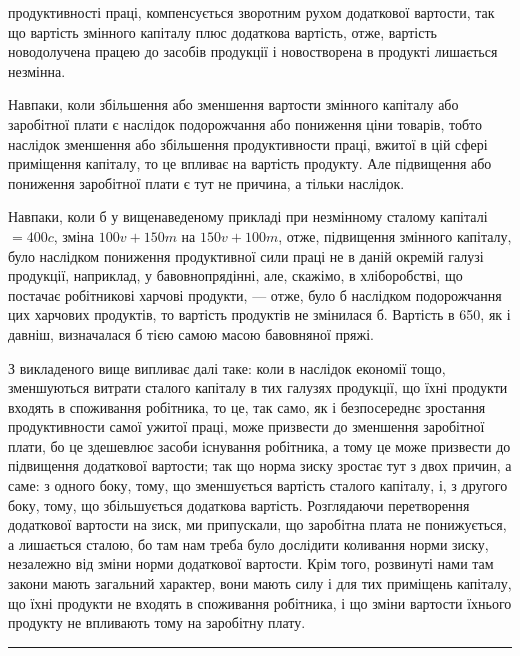 \parcont{}  %
продуктивності праці, компенсується зворотним рухом додаткової вартости, так що
вартість змінного капіталу плюс додаткова вартість, отже, вартість новодолучена
працею до засобів продукції і новостворена в продукті лишається незмінна.

Навпаки, коли збільшення або зменшення вартости змінного капіталу або
заробітної плати є наслідок подорожчання або пониження ціни товарів, тобто
наслідок зменшення або збільшення продуктивности праці, вжитої в цій сфері
приміщення капіталу, то це впливає на вартість продукту. Але підвищення
або пониження заробітної плати є тут не причина, а тільки наслідок.

Навпаки, коли б у вищенаведеному прикладі при незмінному сталому
капіталі $= 400 c$, зміна $100 v + 150 m$ на $150 v + 100 m$, отже, підвищення
змінного капіталу, було наслідком пониження продуктивної сили праці не в даній
окремій галузі продукції, наприклад, у бавовнопрядінні, але, скажімо, в хліборобстві,
що постачає робітникові харчові продукти, — отже, було б наслідком
подорожчання цих харчових продуктів, то вартість продуктів не змінилася б.
Вартість в 650, як і давніш, визначалася б тією самою масою бавовняної пряжі.

З викладеного вище випливає далі таке: коли в наслідок економії тощо,
зменшуються витрати сталого капіталу в тих галузях продукції, що їхні продукти
входять в споживання робітника, то це, так само, як і безпосереднє зростання
продуктивности самої ужитої праці, може призвести до зменшення заробітної
плати, бо це здешевлює засоби існування робітника, а тому це може
призвести до підвищення додаткової вартости; так що норма зиску зростає тут
з двох причин, а саме: з одного боку, тому, що зменшується вартість сталого
капіталу, і, з другого боку, тому, що збільшується додаткова вартість. Розглядаючи
перетворення додаткової вартости на зиск, ми припускали, що заробітна
плата не понижується, а лишається сталою, бо там нам треба було дослідити
коливання норми зиску, незалежно від зміни норми додаткової вартости. Крім
того, розвинуті нами там закони мають загальний характер, вони мають силу
і для тих приміщень капіталу, що їхні продукти не входять в споживання робітника,
і що зміни вартости їхнього продукту не впливають тому на заробітну плату.

\pfbreak

